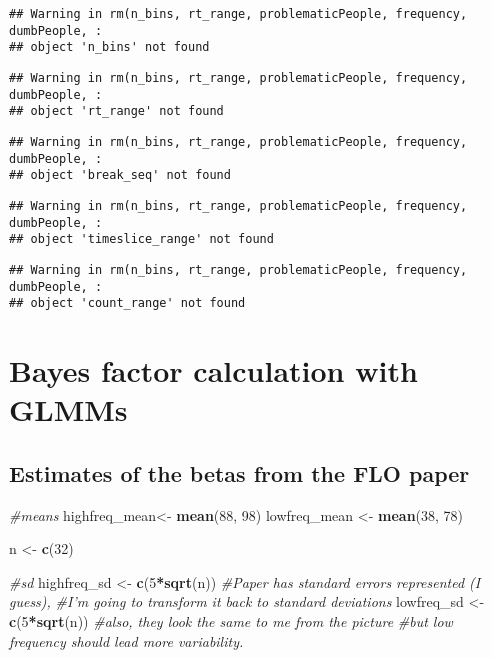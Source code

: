 \documentclass[
]{article}
\newenvironment{Shaded}{\begin{snugshade}}{\end{snugshade}}
\newcommand{\CommentTok}[1]{\textcolor[rgb]{0.56,0.35,0.01}{\textit{#1}}}
\newcommand{\DecValTok}[1]{\textcolor[rgb]{0.00,0.00,0.81}{#1}}
\newcommand{\KeywordTok}[1]{\textcolor[rgb]{0.13,0.29,0.53}{\textbf{#1}}}
\newcommand{\NormalTok}[1]{#1}
\newcommand{\OperatorTok}[1]{\textcolor[rgb]{0.81,0.36,0.00}{\textbf{#1}}}
\newcommand{\StringTok}[1]{\textcolor[rgb]{0.31,0.60,0.02}{#1}}
\begin{document}
\begin{verbatim}
## Warning in rm(n_bins, rt_range, problematicPeople, frequency, dumbPeople, :
## object 'n_bins' not found
\end{verbatim}

\begin{verbatim}
## Warning in rm(n_bins, rt_range, problematicPeople, frequency, dumbPeople, :
## object 'rt_range' not found
\end{verbatim}

\begin{verbatim}
## Warning in rm(n_bins, rt_range, problematicPeople, frequency, dumbPeople, :
## object 'break_seq' not found
\end{verbatim}

\begin{verbatim}
## Warning in rm(n_bins, rt_range, problematicPeople, frequency, dumbPeople, :
## object 'timeslice_range' not found
\end{verbatim}

\begin{verbatim}
## Warning in rm(n_bins, rt_range, problematicPeople, frequency, dumbPeople, :
## object 'count_range' not found
\end{verbatim}

\hypertarget{bayes-factor-calculation-with-glmms}{%
\section{Bayes factor calculation with
GLMMs}\label{bayes-factor-calculation-with-glmms}}

\hypertarget{estimates-of-the-betas-from-the-flo-paper}{%
\subsection{Estimates of the betas from the FLO
paper}\label{estimates-of-the-betas-from-the-flo-paper}}

\begin{Shaded}
\begin{Highlighting}[]
\CommentTok{#means}
\NormalTok{highfreq_mean<-}\StringTok{ }\KeywordTok{mean}\NormalTok{(}\DecValTok{88}\NormalTok{, }\DecValTok{98}\NormalTok{)}
\NormalTok{lowfreq_mean <-}\StringTok{ }\KeywordTok{mean}\NormalTok{(}\DecValTok{38}\NormalTok{, }\DecValTok{78}\NormalTok{)}

\NormalTok{n <-}\StringTok{ }\KeywordTok{c}\NormalTok{(}\DecValTok{32}\NormalTok{) }

\CommentTok{#sd}
\NormalTok{highfreq_sd <-}\StringTok{ }\KeywordTok{c}\NormalTok{(}\DecValTok{5}\OperatorTok{*}\KeywordTok{sqrt}\NormalTok{(n))  }\CommentTok{#Paper has standard errors represented (I guess),}
                     \CommentTok{#I'm going to transform it back to standard deviations}
\NormalTok{lowfreq_sd <-}\StringTok{ }\KeywordTok{c}\NormalTok{(}\DecValTok{5}\OperatorTok{*}\KeywordTok{sqrt}\NormalTok{(n)) }\CommentTok{#also, they look the same to me from the picture}
                           \CommentTok{#but low frequency should lead more variability.}
\end{Highlighting}
\end{Shaded}
\end{document}

